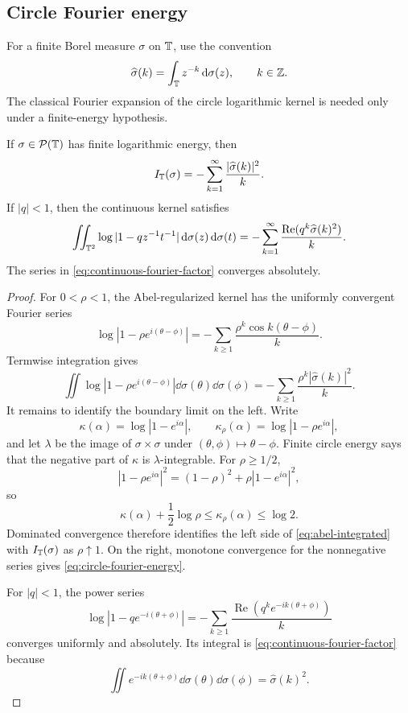 \subsection{Circle Fourier energy}

For a finite Borel measure \(\sigma\) on \(\mathbb{T}\), use the convention
\[
 \widehat\sigma(k)=\int_{\mathbb{T}}z^{-k}\,\mathrm{d}\sigma(z),
 \qquad k\in\mathbb{Z}.
\]
The classical Fourier expansion of the circle logarithmic kernel is
needed only under a finite-energy hypothesis.

\begin{lemma}\label{lem:circle-fourier}
If \(\sigma\in\mathcal P(\mathbb{T})\) has finite logarithmic energy, then
\begin{equation}\label{eq:circle-fourier-energy}
 I_{\mathbb{T}}(\sigma)
 =-\sum_{k=1}^{\infty}\frac{|\widehat\sigma(k)|^2}{k}.
\end{equation}
If \(|q|<1\), then the continuous kernel satisfies
\begin{equation}\label{eq:continuous-fourier-factor}
 \iint_{\mathbb{T}^2}\log|1-qz^{-1}t^{-1}|
 \,\mathrm{d}\sigma(z)\,\mathrm{d}\sigma(t)
 =-\sum_{k=1}^{\infty}
 \frac{\operatorname{Re}(q^k\widehat\sigma(k)^2)}{k}.
\end{equation}
The series in \eqref{eq:continuous-fourier-factor} converges absolutely.
\end{lemma}

\begin{proof}
For \(0<\rho<1\), the Abel-regularized kernel has the uniformly
convergent Fourier series
\[
 \log|1-\rho e^{i(\theta-\phi)}|
 =-\sum_{k\geq1}\frac{\rho^k\cos k(\theta-\phi)}{k}.
\]
Termwise integration gives
\begin{equation}\label{eq:abel-integrated}
 \iint\log|1-\rho e^{i(\theta-\phi)}|
 \dd\sigma(\theta)\dd\sigma(\phi)
 =-\sum_{k\geq1}\frac{\rho^k|\widehat\sigma(k)|^2}{k}.
\end{equation}
It remains to identify the boundary limit on the left.  Write
\[
 \kappa(\alpha)=\log|1-e^{i\alpha}|,
 \qquad
 \kappa_\rho(\alpha)=\log|1-\rho e^{i\alpha}|,
\]
and let \(\lambda\) be the image of \(\sigma\times\sigma\) under
\((\theta,\phi)\mapsto\theta-\phi\).  Finite circle energy says that
the negative part of \(\kappa\) is \(\lambda\)-integrable.  For
\(\rho\geq1/2\),
\[
 |1-\rho e^{i\alpha}|^2
 =(1-\rho)^2+\rho|1-e^{i\alpha}|^2,
\]
so
\[
 \kappa(\alpha)+\frac12\log\rho
 \leq\kappa_\rho(\alpha)\leq\log2.
\]
Dominated convergence therefore identifies the left side of
\eqref{eq:abel-integrated} with \(I_{\mathbb{T}}(\sigma)\) as
\(\rho\uparrow1\).  On the right, monotone convergence for the
nonnegative series gives \eqref{eq:circle-fourier-energy}.

For \(|q|<1\), the power series
\[
 \log|1-qe^{-i(\theta+\phi)}|
 =-\sum_{k\geq1}
 \frac{\operatorname{Re}(q^ke^{-ik(\theta+\phi)})}{k}
\]
converges uniformly and absolutely.  Its integral is
\eqref{eq:continuous-fourier-factor} because
\[
 \iint e^{-ik(\theta+\phi)}
 \dd\sigma(\theta)\dd\sigma(\phi)
 =\widehat\sigma(k)^2.
\]
\end{proof}

